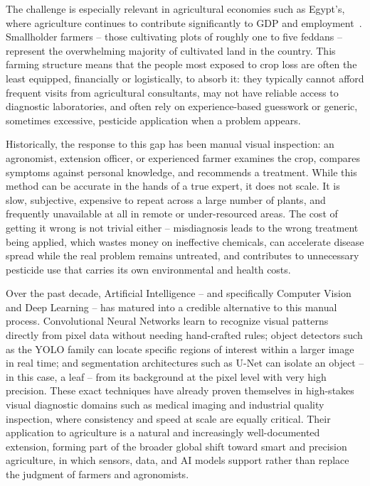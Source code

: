 The challenge is especially relevant in agricultural economies such as Egypt's, where agriculture continues to contribute significantly to GDP and employment~\cite{world_bank_egypt_agri, egyptian_streets_agri}. Smallholder farmers -- those cultivating plots of roughly one to five feddans -- represent the overwhelming majority of cultivated land in the country. This farming structure means that the people most exposed to crop loss are often the least equipped, financially or logistically, to absorb it: they typically cannot afford frequent visits from agricultural consultants, may not have reliable access to diagnostic laboratories, and often rely on experience-based guesswork or generic, sometimes excessive, pesticide application when a problem appears.

Historically, the response to this gap has been manual visual inspection: an agronomist, extension officer, or experienced farmer examines the crop, compares symptoms against personal knowledge, and recommends a treatment. While this method can be accurate in the hands of a true expert, it does not scale. It is slow, subjective, expensive to repeat across a large number of plants, and frequently unavailable at all in remote or under-resourced areas. The cost of getting it wrong is not trivial either -- misdiagnosis leads to the wrong treatment being applied, which wastes money on ineffective chemicals, can accelerate disease spread while the real problem remains untreated, and contributes to unnecessary pesticide use that carries its own environmental and health costs.

Over the past decade, Artificial Intelligence -- and specifically Computer Vision and Deep Learning -- has matured into a credible alternative to this manual process. Convolutional Neural Networks learn to recognize visual patterns directly from pixel data without needing hand-crafted rules; object detectors such as the YOLO family can locate specific regions of interest within a larger image in real time; and segmentation architectures such as U-Net can isolate an object -- in this case, a leaf -- from its background at the pixel level with very high precision. These exact techniques have already proven themselves in high-stakes visual diagnostic domains such as medical imaging and industrial quality inspection, where consistency and speed at scale are equally critical. Their application to agriculture is a natural and increasingly well-documented extension, forming part of the broader global shift toward smart and precision agriculture, in which sensors, data, and AI models support rather than replace the judgment of farmers and agronomists.

